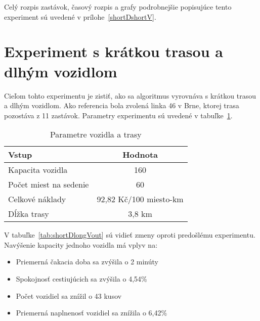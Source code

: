 Celý rozpis zastávok, časový rozpis a grafy podrobnejšie popisujúce tento experiment sú uvedené v prílohe~\ref{shortDshortV}.

\newpage

\section{Experiment s krátkou trasou a dlhým vozidlom}
Cieľom tohto experimentu je zistiť, ako sa algoritmus vyrovnáva s krátkou trasou a dlhým vozidlom.
Ako referencia bola zvolená linka 46 v Brne, ktorej trasa pozostáva z 11 zastávok.
Parametry experimentu sú uvedené v tabuľke~\ref{tab:shortDlongVin}.

\begin{table}[h]
  \centering
  \begin{tabular}{|l|c|}
    \hline
    \textbf{Vstup} & \textbf{Hodnota} \\ \hline
    Kapacita vozidla & 160 \\ \hline
    Počet miest na sedenie & 60 \\ \hline
    Celkové náklady & 92,82 Kč/100 miesto-km \\ \hline
    Dĺžka trasy & 3,8 km \\ \hline
  \end{tabular}
  \caption{Parametre vozidla a trasy}
  \label{tab:shortDlongVin}
\end{table}

V tabuľke~\ref{tab:shortDlongVout} sú vidieť zmeny oproti predošlému experimentu.
Navýšenie kapacity jednoho vozidla má vplyv na:
\begin{itemize}
  \item Priemerná čakacia doba sa zvýšila o 2 minúty
  \item Spokojnosť cestiujúcich sa zvýšila o 4,54\%
  \item Počet vozidiel sa znížil o 43 kusov
  \item Priemerná naplnenosť vozidiel sa znížila o 6,42\%
\end{itemize}

